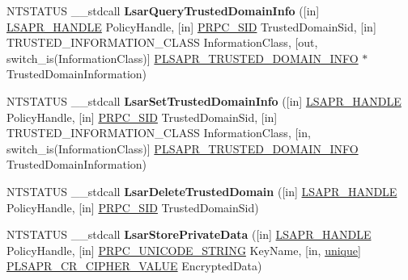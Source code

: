 \begin{DoxyCompactItemize}
\item 
\mbox{\label{interfacelsarpc_a001854f8d9e705ca2e70478e2c034d74}} 
N\+T\+S\+T\+A\+T\+US \+\_\+\+\_\+stdcall {\bfseries Lsar\+Query\+Trusted\+Domain\+Info} (\mbox{[}in\mbox{]} \hyperlink{interfacevoid}{L\+S\+A\+P\+R\+\_\+\+H\+A\+N\+D\+LE} Policy\+Handle, \mbox{[}in\mbox{]} \hyperlink{struct___r_p_c___s_i_d}{P\+R\+P\+C\+\_\+\+S\+ID} Trusted\+Domain\+Sid, \mbox{[}in\mbox{]} T\+R\+U\+S\+T\+E\+D\+\_\+\+I\+N\+F\+O\+R\+M\+A\+T\+I\+O\+N\+\_\+\+C\+L\+A\+SS Information\+Class, \mbox{[}out, switch\+\_\+is(Information\+Class)\mbox{]} \hyperlink{union___l_s_a_p_r___t_r_u_s_t_e_d___d_o_m_a_i_n___i_n_f_o}{P\+L\+S\+A\+P\+R\+\_\+\+T\+R\+U\+S\+T\+E\+D\+\_\+\+D\+O\+M\+A\+I\+N\+\_\+\+I\+N\+FO} $\ast$Trusted\+Domain\+Information)
\item 
\mbox{\label{interfacelsarpc_a35abd88b7912290ffacc5a633cd1943d}} 
N\+T\+S\+T\+A\+T\+US \+\_\+\+\_\+stdcall {\bfseries Lsar\+Set\+Trusted\+Domain\+Info} (\mbox{[}in\mbox{]} \hyperlink{interfacevoid}{L\+S\+A\+P\+R\+\_\+\+H\+A\+N\+D\+LE} Policy\+Handle, \mbox{[}in\mbox{]} \hyperlink{struct___r_p_c___s_i_d}{P\+R\+P\+C\+\_\+\+S\+ID} Trusted\+Domain\+Sid, \mbox{[}in\mbox{]} T\+R\+U\+S\+T\+E\+D\+\_\+\+I\+N\+F\+O\+R\+M\+A\+T\+I\+O\+N\+\_\+\+C\+L\+A\+SS Information\+Class, \mbox{[}in, switch\+\_\+is(Information\+Class)\mbox{]} \hyperlink{union___l_s_a_p_r___t_r_u_s_t_e_d___d_o_m_a_i_n___i_n_f_o}{P\+L\+S\+A\+P\+R\+\_\+\+T\+R\+U\+S\+T\+E\+D\+\_\+\+D\+O\+M\+A\+I\+N\+\_\+\+I\+N\+FO} Trusted\+Domain\+Information)
\item 
\mbox{\label{interfacelsarpc_ac427a161976ca0223f08df8e696c96fe}} 
N\+T\+S\+T\+A\+T\+US \+\_\+\+\_\+stdcall {\bfseries Lsar\+Delete\+Trusted\+Domain} (\mbox{[}in\mbox{]} \hyperlink{interfacevoid}{L\+S\+A\+P\+R\+\_\+\+H\+A\+N\+D\+LE} Policy\+Handle, \mbox{[}in\mbox{]} \hyperlink{struct___r_p_c___s_i_d}{P\+R\+P\+C\+\_\+\+S\+ID} Trusted\+Domain\+Sid)
\item 
\mbox{\label{interfacelsarpc_ab46a124d5dde06d6530c96f3cf66309e}} 
N\+T\+S\+T\+A\+T\+US \+\_\+\+\_\+stdcall {\bfseries Lsar\+Store\+Private\+Data} (\mbox{[}in\mbox{]} \hyperlink{interfacevoid}{L\+S\+A\+P\+R\+\_\+\+H\+A\+N\+D\+LE} Policy\+Handle, \mbox{[}in\mbox{]} \hyperlink{struct___r_p_c___u_n_i_c_o_d_e___s_t_r_i_n_g}{P\+R\+P\+C\+\_\+\+U\+N\+I\+C\+O\+D\+E\+\_\+\+S\+T\+R\+I\+NG} Key\+Name, \mbox{[}in, \hyperlink{interfaceunique}{unique}\mbox{]} \hyperlink{struct___l_s_a_p_r___c_r___c_i_p_h_e_r___v_a_l_u_e}{P\+L\+S\+A\+P\+R\+\_\+\+C\+R\+\_\+\+C\+I\+P\+H\+E\+R\+\_\+\+V\+A\+L\+UE} Encrypted\+Data)

\end{DoxyCompactItemize}

